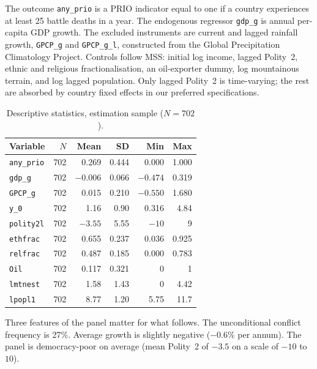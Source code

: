 \documentclass[11pt,a4paper]{article}
\begin{document}
The outcome \texttt{any\_prio} is a PRIO indicator equal to one if a
country experiences at least 25 battle deaths in a year. The endogenous
regressor \texttt{gdp\_g} is annual per-capita GDP growth. The excluded
instruments are current and lagged rainfall growth, \texttt{GPCP\_g}
and \texttt{GPCP\_g\_l}, constructed from the Global Precipitation
Climatology Project. Controls follow MSS: initial log income, lagged
Polity~2, ethnic and religious fractionalisation, an oil-exporter
dummy, log mountainous terrain, and log lagged population. Only lagged
Polity~2 is time-varying; the rest are absorbed by country fixed
effects in our preferred specifications.

\begin{table}[H]
\centering
\caption{Descriptive statistics, estimation sample ($N = 702$).}
\label{tab:descriptives}
\begin{tabular}{lrrrrr}
\toprule
Variable & $N$ & Mean & SD & Min & Max \\
\midrule
\texttt{any\_prio}  & 702 & 0.269   & 0.444 & 0.000   & 1.000 \\
\texttt{gdp\_g}     & 702 & $-0.006$ & 0.066 & $-0.474$ & 0.319 \\
\texttt{GPCP\_g}    & 702 & 0.015   & 0.210 & $-0.550$ & 1.680 \\
\texttt{y\_0}       & 702 & 1.16    & 0.90  & 0.316   & 4.84  \\
\texttt{polity2l}   & 702 & $-3.55$ & 5.55  & $-10$   & 9     \\
\texttt{ethfrac}    & 702 & 0.655   & 0.237 & 0.036   & 0.925 \\
\texttt{relfrac}    & 702 & 0.487   & 0.185 & 0.000   & 0.783 \\
\texttt{Oil}        & 702 & 0.117   & 0.321 & 0       & 1     \\
\texttt{lmtnest}    & 702 & 1.58    & 1.43  & 0       & 4.42  \\
\texttt{lpopl1}     & 702 & 8.77    & 1.20  & 5.75    & 11.7  \\
\bottomrule
\end{tabular}
\end{table}

Three features of the panel matter for what follows. The unconditional
conflict frequency is 27\%. Average growth is slightly negative
($-0.6\%$ per annum). The panel is democracy-poor on average (mean
Polity~2 of $-3.5$ on a scale of $-10$ to $10$).

\end{document}
